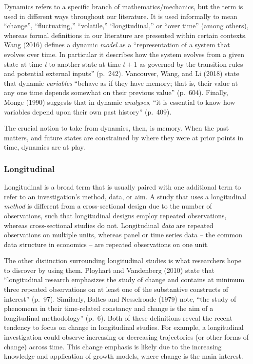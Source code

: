 \documentclass[english,,man]{apa6}
\theoremstyle{definition}
\theoremstyle{definition}
\theoremstyle{definition}
\theoremstyle{remark}
\begin{document}
Dynamics refers to a specific branch of mathematics/mechanics, but the
term is used in different ways throughout our literature. It is used
informally to mean \enquote{change}, \enquote{fluctuating,}
\enquote{volatile,} \enquote{longitudinal,} or \enquote{over time}
(among others), whereas formal definitions in our literature are
presented within certain contexts. Wang (2016) defines a dynamic
\emph{model} as a \enquote{representation of a system that evolves over
time. In particular it describes how the system evolves from a given
state at time \emph{t} to another state at time \(t + 1\) as governed by
the transition rules and potential external inputs} (p.~242). Vancouver,
Wang, and Li (2018) state that dynamic \emph{variables} \enquote{behave
as if they have memory; that is, their value at any one time depends
somewhat on their previous value} (p.~604). Finally, Monge (1990)
suggests that in dynamic \emph{analyses}, \enquote{it is essential to
know how variables depend upon their own past history} (p.~409).

The crucial notion to take from dynamics, then, is memory. When the past
matters, and future states are constrained by where they were at prior
points in time, dynamics are at play.

\hypertarget{longitudinal}{%
\subsubsection{Longitudinal}\label{longitudinal}}

Longitudinal is a broad term that is usually paired with one additional
term to refer to an investigation's method, data, or aim. A study that
uses a longitudinal \emph{method} is different from a cross-sectional
design due to the number of observations, such that longitudinal designs
employ repeated observations, whereas cross-sectional studies do not.
Longitudinal \emph{data} are repeated observations on multiple units,
whereas panel or time series data -- the common data structure in
economics -- are repeated observations on one unit.

The other distinction surrounding longitudinal studies is what
researchers hope to discover by using them. Ployhart and Vandenberg
(2010) state that \enquote{longitudinal research emphasizes the study of
change and contains at minimum three repeated observations on at least
one of the substantive constructs of interest} (p.~97). Similarly,
Baltes and Nesselroade (1979) note, \enquote{the study of phenomena in
their time-related constancy and change is the aim of a longitudinal
methodology} (p.~6). Both of these definitions reveal the recent
tendency to focus on change in longitudinal studies. For example, a
longitudinal investigation could observe increasing or decreasing
trajectories (or other forms of change) across time. This change
emphasis is likely due to the increasing knowledge and application of
growth models, where change is the main interest.
\end{document}
